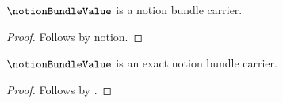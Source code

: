 

\begin{proposition}\label{notion_bundle_import_open}
    $\notionBundleValue$ is a notion bundle carrier.
\end{proposition}
\begin{proof}
    Follows by notion.
\end{proof}

\begin{proposition}\label{notion_bundle_import_exact}
    $\notionBundleValue$ is an exact notion bundle carrier.
\end{proposition}
\begin{proof}
    Follows by .
\end{proof}
